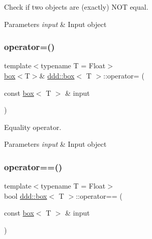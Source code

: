 Check if two objects are (exactly) N\+OT equal. 


\begin{DoxyParams}{Parameters}
{\em input} & Input object \\
\hline
\end{DoxyParams}
\mbox{\label{classddd_1_1box_aa777c01953453974a45b593b9807c1c6}} 
\subsubsection{\texorpdfstring{operator=()}{operator=()}}
{\footnotesize\ttfamily template$<$typename T = Float$>$ \\
\hyperlink{classddd_1_1box}{box}$<$T$>$\& \hyperlink{classddd_1_1box}{ddd\+::box}$<$ T $>$\+::operator= (\begin{DoxyParamCaption}\item[{const \hyperlink{classddd_1_1box}{box}$<$ T $>$ \&}]{input }\end{DoxyParamCaption})\hspace{0.3cm}{\ttfamily [inline]}}



Equality operator. 


\begin{DoxyParams}{Parameters}
{\em input} & Input object \\
\hline
\end{DoxyParams}
\mbox{\label{classddd_1_1box_ac29b13c5b75f74757e7b5ea3806f06f8}} 
\subsubsection{\texorpdfstring{operator==()}{operator==()}}
{\footnotesize\ttfamily template$<$typename T = Float$>$ \\
bool \hyperlink{classddd_1_1box}{ddd\+::box}$<$ T $>$\+::operator== (\begin{DoxyParamCaption}\item[{const \hyperlink{classddd_1_1box}{box}$<$ T $>$ \&}]{input }\end{DoxyParamCaption})\hspace{0.3cm}{\ttfamily [inline]}}




